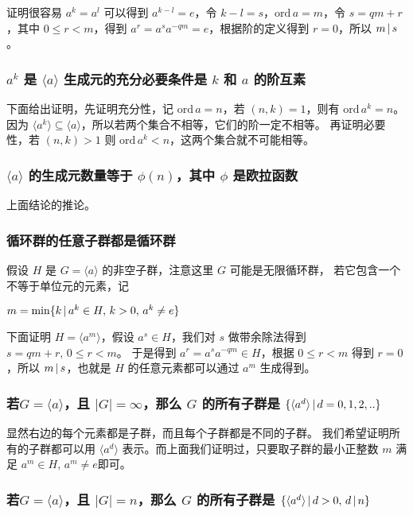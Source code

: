 证明很容易 $a^k = a^l$ 可以得到 $a^{k-l} = e$，令 $k-l = s$，$\mathrm{ord}\, a = m$，令 $s = qm + r$，其中 $0 \le r < m$，得到 $a^r = a^{s}a^{-qm} = e$，根据阶的定义得到 $r = 0$，所以 $m \,\vert\, s$。

\subsubsection{$a^k$ 是 $\langle a \rangle$ 生成元的充分必要条件是 $k$ 和 $a$ 的阶互素}

下面给出证明，先证明充分性，记 $\mathrm{ord}\, a = n$，若 $(n,k) = 1$，则有 $\mathrm{ord}\, a^k = n$。因为 $\langle a^k \rangle \subseteq \langle a \rangle$，所以若两个集合不相等，它们的阶一定不相等。
再证明必要性，若 $(n,k) > 1$ 则 $\mathrm{ord}\, a^k < n$，这两个集合就不可能相等。

\subsubsection{ $\langle a \rangle$ 的生成元数量等于 $\phi(n)$，其中 $\phi$ 是欧拉函数}

上面结论的推论。

\subsubsection{循环群的任意子群都是循环群}

假设 $H$ 是 $G =\langle a \rangle$ 的非空子群，注意这里 $G$ 可能是无限循环群， 若它包含一个不等于单位元的元素，记

$m = \min \{ k \,\vert\, a^k \in H,\, k > 0,\, a^k \ne e \}$

下面证明 $H = \langle a^m \rangle $，假设 $a^s \in H$，我们对 $s$ 做带余除法得到 $s = qm + r,\, 0 \le r < m$。
于是得到 $a^{r} = a^{s}a^{-qm} \in H$，根据 $0 \le r < m$ 得到 $r = 0$，所以 $m \,\vert\, s$，也就是 $H$ 的任意元素都可以通过 $a^m$ 生成得到。

\subsubsection{若$G = \langle a \rangle $，且 $\lvert G \rvert = \infty$，那么 $G$ 的所有子群是 $\{ \langle a ^d \rangle \,\vert\, d = 0,1,2,..\}$ }

显然右边的每个元素都是子群，而且每个子群都是不同的子群。
我们希望证明所有的子群都可以用 $\langle a^d \rangle$ 表示。而上面我们证明过，只要取子群的最小正整数 $m$ 满足 $a^m \in H,\, a^m \ne e$即可。

\subsubsection{若$G = \langle a \rangle $，且 $\lvert G \rvert = n$，那么 $G$ 的所有子群是 $\{ \langle a ^d \rangle \,\vert\, d > 0,\, d \,\vert\, n\}$ }

